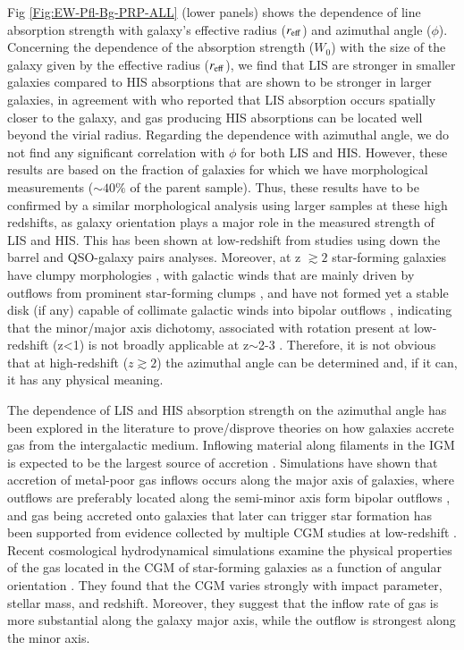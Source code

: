 \documentclass[longauth]{aa}
\begin{document}
Fig \ref{Fig:EW-Pfl-Bg-PRP-ALL} (lower panels) shows the dependence of line
absorption strength with galaxy's effective radius ($r_{\rm{eff}}$) and
azimuthal angle ($\phi$). Concerning the dependence of the absorption
strength ($W_{0}$) with the size of the galaxy given by the effective radius
($r_{\rm{eff}}$), we find that LIS are stronger in smaller galaxies compared
to HIS absorptions that are shown to be stronger in larger galaxies, in
agreement with \cite{Rudie19} who reported that LIS absorption occurs
spatially closer to the galaxy, and gas producing HIS absorptions can be
located well beyond the virial radius. Regarding the dependence with
azimuthal angle, we do not find any significant correlation with $\phi$ for
both LIS and HIS. However, these results are based on the fraction of
galaxies for which we have morphological measurements ($\sim 40\%$ of the
parent sample). Thus, these results have to be confirmed by a similar
morphological analysis using larger samples at these high redshifts, as
galaxy orientation plays a major role in the measured strength of LIS and
HIS. This has been shown at low-redshift from studies using down the
barrel \citep{Rubin14,Bordoloi14b} and QSO-galaxy pairs \citep
{Kacprzak11b,Bordoloi11} analyses. Moreover, at z $\gtrsim2$ star-forming
galaxies have clumpy morphologies \citep{Foster11}, with galactic winds that
are mainly driven by outflows from prominent star-forming clumps \citep
{Genzel11}, and have not formed yet a stable disk (if any) capable of
collimate galactic winds into bipolar outflows \citep{FaucherG17}, indicating
that the minor/major axis dichotomy, associated with rotation present at
low-redshift (z<1) is not broadly applicable at z$\sim$2-3 
\citep{Law12,Nelson19,Price20}. Therefore, it is not obvious that at
high-redshift ($z\gtrsim2$) the azimuthal angle can be determined and, if it
can, it has any physical meaning.

The dependence of LIS and HIS absorption strength on the azimuthal angle has
been explored in the literature to prove/disprove theories on how galaxies
accrete gas from the intergalactic medium. Inflowing material along filaments
in the IGM is expected to be the largest source of accretion \citep
{Keres05}. Simulations have shown that accretion of metal-poor gas inflows
occurs along the major axis of galaxies, where outflows are preferably
located along the semi-minor axis form bipolar outflows \citep{Putman17}, and
gas being accreted onto galaxies that later can trigger star formation has
been supported from evidence collected by multiple CGM studies at
low-redshift \citep
{Kacprzak10,Kacprzak12a,Kacprzak15a,Kacprzak19,Lan18,Martin19a,Nielsen15,
Rubin18b,Zhu13a,Tumlinson11a,Bordoloi14a,Lan14}. Recent cosmological
hydrodynamical simulations examine the physical properties of the gas located
in the CGM of star-forming galaxies as a function of angular
orientation \citep{Peroux20b}. They found that the CGM varies strongly with
impact parameter, stellar mass, and redshift. Moreover, they suggest that the
inflow rate of gas is more substantial along the galaxy major axis, while the
outflow is strongest along the minor axis. 
\end{document}
